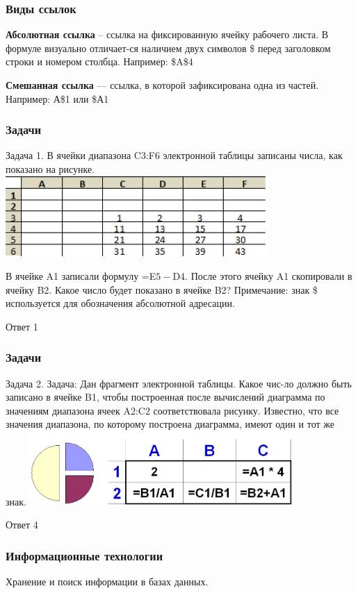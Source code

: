 \begin{frame}[fragile]
\frametitle{Виды ссылок}

\textbf{Абсолютная ссылка} – ссылка на фиксированную ячейку рабочего листа. В формуле визуально отличает-ся наличием двух символов \$ перед заголовком строки и номером столбца. Например: \$A\$4

\textbf{Смешанная ссылка } --- ссылка, в которой зафиксирована одна из частей. Например: А\$1 или \$А1
\end{frame}


\begin{frame}[fragile]
\frametitle{Задачи}

Задача 1.	В ячейки диапазона C3:F6 электронной таблицы записаны числа, как показано на рисунке.
\includegraphics[width=10cm]{images/it_6}

В ячейке A1 записали формулу =E$5-$D4. После этого ячейку A1 скопировали в ячейку B2. Какое число будет показано в ячейке B2? Примечание: знак \$ используется для обозначения абсолютной адресации.

\pause 
Ответ 1

\end{frame}

\begin{frame}[fragile]
\frametitle{Задачи}

Задача 2.	Задача: Дан фрагмент электронной таблицы. Какое чис-ло должно быть записано в ячейке B1, чтобы построенная после вычислений диаграмма по значениям диапазона ячеек A2:C2 соответствовала рисунку. Известно, что все значения диапазона, по которому построена диаграмма, имеют один и тот же знак.
\includegraphics[width=10cm]{images/it_7}

\pause 
Ответ 4

\end{frame}


\begin{frame}
\frametitle{Информационные технологии}

\begin{center}

\Huge
Хранение  и  поиск информации в базах данных.
	
\end{center}

\end{frame}


